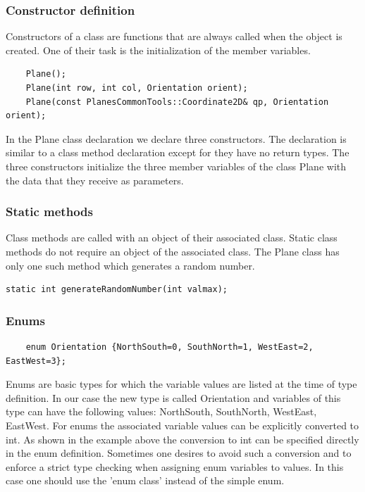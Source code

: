 \subsubsection {Constructor definition}
Constructors of a class are functions that are always called when the object is created. One of their task is the initialization of the member variables.
\begin{lstlisting}
    Plane();
    Plane(int row, int col, Orientation orient);
    Plane(const PlanesCommonTools::Coordinate2D& qp, Orientation orient);
\end{lstlisting}
In the Plane class declaration we declare three constructors. The declaration is similar to a class method declaration except for they have no return types. The three constructors initialize the three member variables of the class Plane with the data that they receive as parameters. 

\subsubsection {Static methods}
Class methods are called with an object of their associated class. Static class methods do not require an object of the associated class. The Plane class has only one such method which generates a random number.
\begin{lstlisting}
static int generateRandomNumber(int valmax);
\end{lstlisting}

\subsubsection {Enums}

\begin{lstlisting}
    enum Orientation {NorthSouth=0, SouthNorth=1, WestEast=2, EastWest=3};
\end{lstlisting}
Enums are basic types for which the variable values are listed at the time of type definition. In our case the new type is called Orientation and variables of this type can have the following values: NorthSouth, SouthNorth, WestEast, EastWest. For enums the associated variable values can be explicitly converted to int. As shown in the example above the conversion to int can be specified directly in the enum definition. Sometimes one desires to avoid such a conversion and to enforce a strict type checking when assigning enum variables to values. In this case one should use the 'enum class' instead of the simple enum.  

